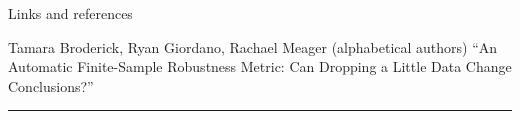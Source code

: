 \documentclass[10pt]{beamer}
\begin{document}
% 





\begin{frame}{Links and references}

\footnotesize

Tamara Broderick, Ryan Giordano, Rachael Meager (alphabetical authors) \newline
``An Automatic Finite-Sample Robustness Metric: Can Dropping a Little Data Change Conclusions?''

\par\noindent\rule{\textwidth}{0.4pt}



\begingroup
\renewcommand{\section}[2]{}%
{
\tiny

}
\endgroup

\end{frame}
\end{document}

